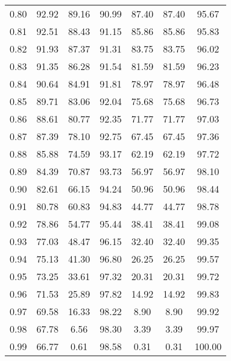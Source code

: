 \begin{tabular}{|c|c|c|c|c|c|c|}
      0.80 &     92.92 &     89.16 &      90.99 &   87.40 &      87.40 &         95.67 \\
      0.81 &     92.51 &     88.43 &      91.15 &   85.86 &      85.86 &         95.83 \\
      0.82 &     91.93 &     87.37 &      91.31 &   83.75 &      83.75 &         96.02 \\
      0.83 &     91.35 &     86.28 &      91.54 &   81.59 &      81.59 &         96.23 \\
      0.84 &     90.64 &     84.91 &      91.81 &   78.97 &      78.97 &         96.48 \\
      0.85 &     89.71 &     83.06 &      92.04 &   75.68 &      75.68 &         96.73 \\
      0.86 &     88.61 &     80.77 &      92.35 &   71.77 &      71.77 &         97.03 \\
      0.87 &     87.39 &     78.10 &      92.75 &   67.45 &      67.45 &         97.36 \\
      0.88 &     85.88 &     74.59 &      93.17 &   62.19 &      62.19 &         97.72 \\
      0.89 &     84.39 &     70.87 &      93.73 &   56.97 &      56.97 &         98.10 \\
      0.90 &     82.61 &     66.15 &      94.24 &   50.96 &      50.96 &         98.44 \\
      0.91 &     80.78 &     60.83 &      94.83 &   44.77 &      44.77 &         98.78 \\
      0.92 &     78.86 &     54.77 &      95.44 &   38.41 &      38.41 &         99.08 \\
      0.93 &     77.03 &     48.47 &      96.15 &   32.40 &      32.40 &         99.35 \\
      0.94 &     75.13 &     41.30 &      96.80 &   26.25 &      26.25 &         99.57 \\
      0.95 &     73.25 &     33.61 &      97.32 &   20.31 &      20.31 &         99.72 \\
      0.96 &     71.53 &     25.89 &      97.82 &   14.92 &      14.92 &         99.83 \\
      0.97 &     69.58 &     16.33 &      98.22 &    8.90 &       8.90 &         99.92 \\
      0.98 &     67.78 &      6.56 &      98.30 &    3.39 &       3.39 &         99.97 \\
      0.99 &     66.77 &      0.61 &      98.58 &    0.31 &       0.31 &        100.00 \\
\bottomrule
\end{tabular}
